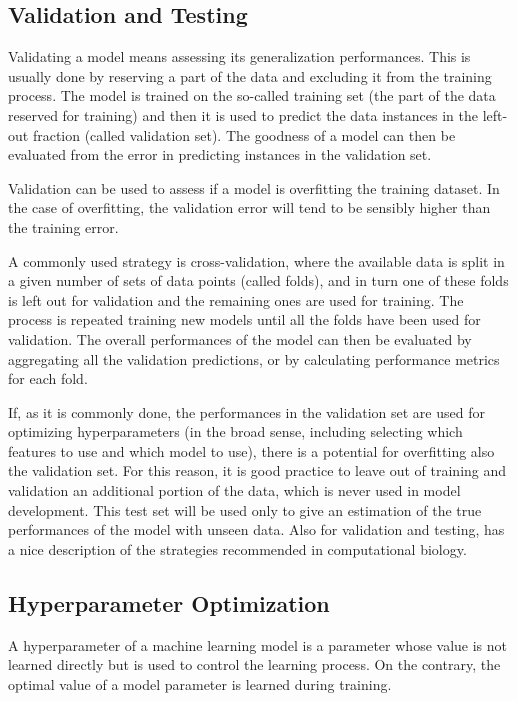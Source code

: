 \subsection{Validation and Testing}
Validating a model means assessing its generalization performances.
This is usually done by reserving a part of the data and excluding it from the training process.
The model is trained on the so-called training set (the part of the data reserved for training) and then it is used to predict the data instances in the left-out fraction (called validation set).
The goodness of a model can then be evaluated from the error in predicting instances in the validation set.

Validation can be used to assess if a model is overfitting the training dataset.
In the case of overfitting, the validation error will tend to be sensibly higher than the training error.

A commonly used strategy is cross-validation, where the available data is split in a given number of sets of data points (called folds), and in turn one of these folds is left out for validation and the remaining ones are used for training.
The process is repeated training new models until all the folds have been used for validation.
The overall performances of the model can then be evaluated by aggregating all the validation predictions, or by calculating performance metrics for each fold.

If, as it is commonly done, the performances in the validation set are used for optimizing hyperparameters (in the broad sense, including selecting which features to use and which model to use), there is a potential for overfitting also the validation set.
For this reason, it is good practice to leave out of training and validation an additional portion of the data, which is never used in model development.
This test set will be used only to give an estimation of the true performances of the model with unseen data.
Also for validation and testing, \textcite{Chicco2017} has a nice description of the strategies recommended in computational biology.

\subsection{Hyperparameter Optimization}
A hyperparameter of a machine learning model is a parameter whose value is not learned directly but is used to control the learning process.
On the contrary, the optimal value of a model parameter is learned during training.

